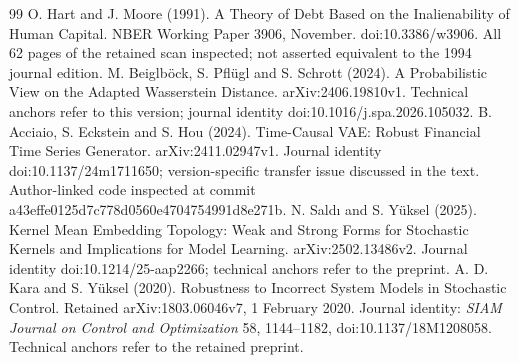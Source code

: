 \documentclass[11pt,a4paper]{article}
\begin{document}
\begin{thebibliography}{99}
 O. Hart and J. Moore (1991). A Theory of Debt Based on the Inalienability of Human Capital. NBER Working Paper 3906, November. doi:10.3386/w3906. All 62 pages of the retained scan inspected; not asserted equivalent to the 1994 journal edition.
 M. Beiglb\"ock, S. Pfl\"ugl and S. Schrott (2024). A Probabilistic View on the Adapted Wasserstein Distance. arXiv:2406.19810v1. Technical anchors refer to this version; journal identity doi:10.1016/j.spa.2026.105032.
 B. Acciaio, S. Eckstein and S. Hou (2024). Time-Causal VAE: Robust Financial Time Series Generator. arXiv:2411.02947v1. Journal identity doi:10.1137/24m1711650; version-specific transfer issue discussed in the text. Author-linked code inspected at commit a43effe0125d7c778d0560e4704754991d8e271b.
 N. Sald\i{} and S. Y\"uksel (2025). Kernel Mean Embedding Topology: Weak and Strong Forms for Stochastic Kernels and Implications for Model Learning. arXiv:2502.13486v2. Journal identity doi:10.1214/25-aap2266; technical anchors refer to the preprint.
 A. D. Kara and S. Y\"uksel (2020). Robustness to Incorrect System Models in Stochastic Control. Retained arXiv:1803.06046v7, 1 February 2020. Journal identity: \emph{SIAM Journal on Control and Optimization} 58, 1144--1182, doi:10.1137/18M1208058. Technical anchors refer to the retained preprint.
\end{thebibliography}
\endgroup
\end{document}
